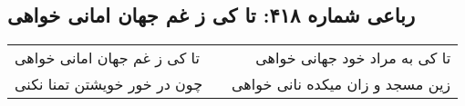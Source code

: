 \begin{center}
\section*{رباعی شماره ۴۱۸: تا کی ز غم جهان امانی خواهی}
\label{sec:sh418}
\begin{longtable}{l p{0.5cm} r}
تا کی ز غم جهان امانی خواهی
&&
تا کی به مراد خود جهانی خواهی
\\
چون در خور خویشتن تمنا نکنی
&&
زین مسجد و زان میکده نانی خواهی
\\
\end{longtable}
\end{center}
